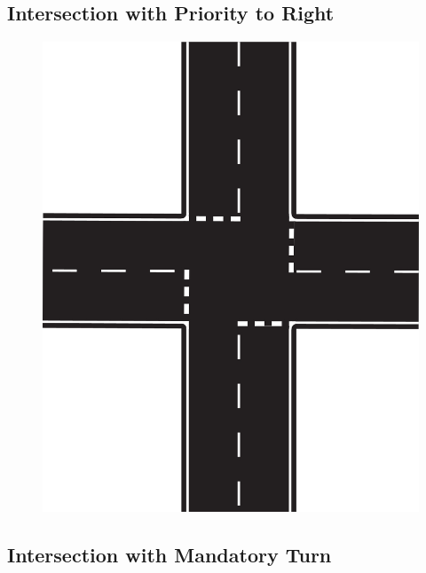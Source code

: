\subsection{Intersection with Priority to Right}
\label{fig_intersection_priority}
\begin{figure}[H]
	\begin{center}
		\centering\includegraphics[]{graphics/Abb_13_intersection_priority.jpg}
	\end{center}
\end{figure}

\subsection{Intersection with Mandatory Turn}
\label{fig_intersection_mandatory}
